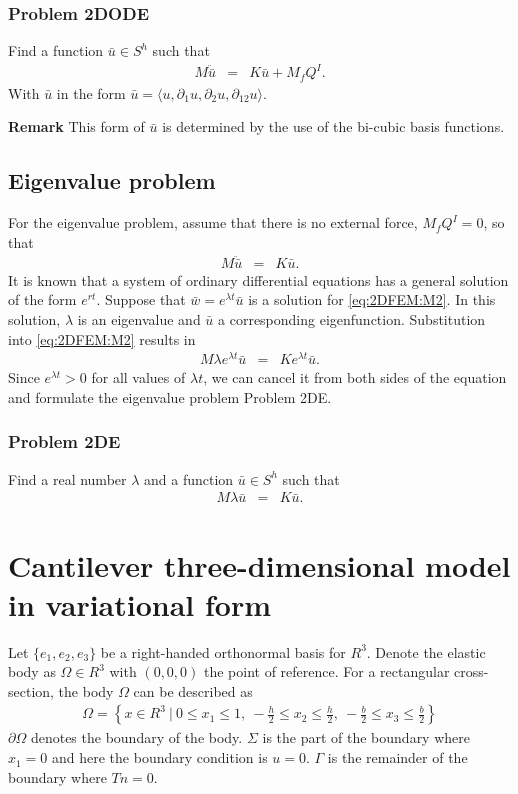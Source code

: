 \subsubsection*{Problem 2DODE}
Find a function $\bar{u} \in S^h$ such that
\begin{eqnarray}
	M\ddot{\bar{u}} & = & K\bar{u} + M_{f}Q^I.
\end{eqnarray} With $\bar{u}$ in the form $\bar{u} = \langle u, \partial_1 u, \partial_2 u, \partial_{12} u \rangle$.

\textbf{Remark} This form of $\bar{u}$ is determined by the use of the bi-cubic basis functions.

\subsection*{Eigenvalue problem}\label{2dFEM_EP}
For the eigenvalue problem, assume that there is no external force, $M_{f}Q^I = 0$, so that 
\begin{eqnarray}
		M\ddot{\bar{u}} & = & K\bar{u}.\label{eq:2DFEM:M2}
\end{eqnarray}
It is known that a system of ordinary differential equations has a general solution of the form $e^{rt}$. Suppose that $\bar{w} = e^{\lambda t} \bar{u}$ is a solution for \eqref{eq:2DFEM:M2}. In this solution, $\lambda$ is an eigenvalue and $\bar{u}$ a corresponding eigenfunction. Substitution into \eqref{eq:2DFEM:M2} results in
\begin{eqnarray*}
	M\lambda e^{\lambda t}\bar{u} & = & Ke^{\lambda t}\bar{u}.
\end{eqnarray*}
Since $e^{\lambda t} > 0$ for all values of $\lambda t$, we can cancel it from both sides of the equation and formulate the eigenvalue problem Problem 2DE.

\subsubsection*{Problem 2DE}
Find a real number $\lambda$ and a function $\bar{u} \in S^h$ such that
\begin{eqnarray}
	M\lambda{\bar{u}} & = & K\bar{u}.
\end{eqnarray}

\section{Cantilever three-dimensional model in variational form} \label{ssec:3D_Model:FEM}
	Let $\{e_1,e_2,e_3\}$ be a right-handed orthonormal basis for $R^3$. Denote the elastic body as $\Omega \in R^3$ with $(0,0,0)$ the point of reference. For a rectangular cross-section, the body $\Omega$ can be described as
	\begin{eqnarray*}
		\Omega = \left\{ x \in R^3 \ | \ 0 \leq x_1 \leq 1, \ -\frac{h}{2} \leq x_2 \leq \frac{h}{2} , \ -\frac{b}{2} \leq x_3 \leq \frac{b}{2}\right \}
	\end{eqnarray*}
	$\partial \Omega$ denotes the boundary of the body. $\Sigma$ is the part of the boundary where $x_1 = 0$ and here the boundary condition is $u = 0$. $\Gamma$ is the remainder of the boundary where $Tn = 0$.


